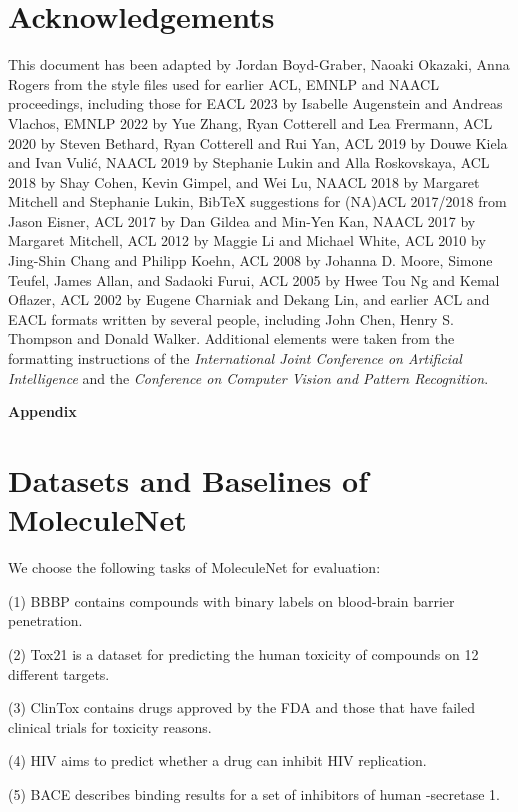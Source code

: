 \documentclass[11pt]{article}
\begin{document}
\section*{Acknowledgements}
This document has been adapted by Jordan Boyd-Graber, Naoaki Okazaki, Anna Rogers from the style files used for earlier ACL, EMNLP and NAACL proceedings, including those for
EACL 2023 by Isabelle Augenstein and Andreas Vlachos,
EMNLP 2022 by Yue Zhang, Ryan Cotterell and Lea Frermann,
ACL 2020 by Steven Bethard, Ryan Cotterell and Rui Yan,
ACL 2019 by Douwe Kiela and Ivan Vuli\'{c},
NAACL 2019 by Stephanie Lukin and Alla Roskovskaya, 
ACL 2018 by Shay Cohen, Kevin Gimpel, and Wei Lu, 
NAACL 2018 by Margaret Mitchell and Stephanie Lukin,
Bib\TeX{} suggestions for (NA)ACL 2017/2018 from Jason Eisner,
ACL 2017 by Dan Gildea and Min-Yen Kan, NAACL 2017 by Margaret Mitchell, 
ACL 2012 by Maggie Li and Michael White, 
ACL 2010 by Jing-Shin Chang and Philipp Koehn, 
ACL 2008 by Johanna D. Moore, Simone Teufel, James Allan, and Sadaoki Furui, 
ACL 2005 by Hwee Tou Ng and Kemal Oflazer, 
ACL 2002 by Eugene Charniak and Dekang Lin, 
and earlier ACL and EACL formats written by several people, including
John Chen, Henry S. Thompson and Donald Walker.
Additional elements were taken from the formatting instructions of the \emph{International Joint Conference on Artificial Intelligence} and the \emph{Conference on Computer Vision and Pattern Recognition}.
\fi



\appendix

\noindent\textbf{Appendix}


\section{Datasets and Baselines of MoleculeNet}
\label{sec:moleculenet_baseline}
We choose the following tasks of MoleculeNet for evaluation:

\noindent(1) BBBP contains compounds with binary labels on blood-brain barrier penetration.

\noindent(2) Tox21 is a dataset for predicting the human toxicity of compounds on 12 different targets.

\noindent(3) ClinTox contains drugs approved by the FDA and those that have failed clinical trials for toxicity reasons.

\noindent(4) HIV aims to predict whether a drug can inhibit HIV replication.

\noindent(5) BACE describes binding results for a set of inhibitors of human -secretase 1.
\end{document}
